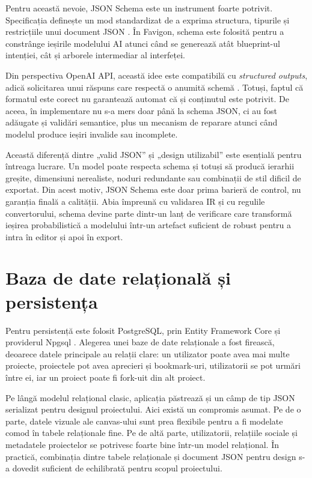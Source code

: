 Pentru această nevoie, JSON Schema este un instrument foarte potrivit. Specificația definește un mod standardizat de a exprima structura, tipurile și restricțiile unui document JSON \cite{jsonSchemaCore2022,jsonSchemaValidation2022}. În Favigon, schema este folosită pentru a constrânge ieșirile modelului AI atunci când se generează atât blueprint-ul intenției, cât și arborele intermediar al interfeței.

Din perspectiva OpenAI API, această idee este compatibilă cu \textit{structured outputs}, adică solicitarea unui răspuns care respectă o anumită schemă \cite{openaiStructuredOutputs2026,openaiChatCompletions2026}. Totuși, faptul că formatul este corect nu garantează automat că și conținutul este potrivit. De aceea, în implementare nu s-a mers doar până la schema JSON, ci au fost adăugate și validări semantice, plus un mecanism de reparare atunci când modelul produce ieșiri invalide sau incomplete.

Această diferență dintre „valid JSON” și „design utilizabil” este esențială pentru întreaga lucrare. Un model poate respecta schema și totuși să producă ierarhii greșite, dimensiuni nerealiste, noduri redundante sau combinații de stil dificil de exportat. Din acest motiv, JSON Schema este doar prima barieră de control, nu garanția finală a calității. Abia împreună cu validarea IR și cu regulile convertorului, schema devine parte dintr-un lanț de verificare care transformă ieșirea probabilistică a modelului într-un artefact suficient de robust pentru a intra în editor și apoi în export.

\section{Baza de date relațională și persistența}

Pentru persistență este folosit PostgreSQL, prin Entity Framework Core și providerul Npgsql \cite{postgresql16docs2026,npgsqlEfCore2026}. Alegerea unei baze de date relaționale a fost firească, deoarece datele principale au relații clare: un utilizator poate avea mai multe proiecte, proiectele pot avea aprecieri și bookmark-uri, utilizatorii se pot urmări între ei, iar un proiect poate fi fork-uit din alt proiect.

Pe lângă modelul relațional clasic, aplicația păstrează și un câmp de tip JSON serializat pentru designul proiectului. Aici există un compromis asumat. Pe de o parte, datele vizuale ale canvas-ului sunt prea flexibile pentru a fi modelate comod în tabele relaționale fine. Pe de altă parte, utilizatorii, relațiile sociale și metadatele proiectelor se potrivesc foarte bine într-un model relațional. În practică, combinația dintre tabele relaționale și document JSON pentru design s-a dovedit suficient de echilibrată pentru scopul proiectului.


